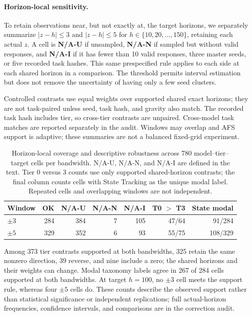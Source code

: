 \documentclass{article}
\begin{document}
\paragraph{Horizon-local sensitivity.}
To retain observations near, but not exactly at, the target horizons, we
separately summarize $|z-h|\leq 3$ and $|z-h|\leq 5$ for
$h\in\{10,20,\ldots,150\}$, retaining each actual $z$. A cell is
\textbf{N/A-U} if unsampled, \textbf{N/A-N} if sampled but without valid
responses, and \textbf{N/A-I} if it has fewer than 10 valid responses, three
master seeds, or five recorded task hashes. This same prespecified rule applies
to each side at each shared horizon in a comparison. The threshold permits
interval estimation but does not remove the uncertainty of having only a few
seed clusters.

Controlled contrasts use equal weights over supported shared exact horizons;
they are not task-paired unless seed, task hash, and gravity also match.
The recorded task hash includes tier, so cross-tier contrasts are unpaired.
Cross-model task matches are reported separately in the audit. Windows may
overlap and AFS support is adaptive; these summaries are not a balanced
fixed-grid experiment.

\begin{table}[H]
\centering
\caption{Horizon-local coverage and descriptive robustness across 780 model--tier--target cells per bandwidth. N/A-U, N/A-N, and N/A-I are defined in the text. Tier 0 versus 3 counts use only supported shared-horizon contrasts; the final column counts cells with State Tracking as the unique modal label. Repeated cells and overlapping windows are not independent.}
\label{tab:horizon_local_sensitivity}
\scriptsize
\begin{tabular}{lrrrrrr}
\toprule
Window & OK & N/A-U & N/A-N & N/A-I & T0 $>$ T3 & State modal \\
\midrule
$\pm3$ & 284 & 384 & 7 & 105 & 47/64 & 91/284 \\
$\pm5$ & 329 & 352 & 6 & 93 & 55/75 & 108/329 \\
\bottomrule
\end{tabular}
\end{table}

Among 373 tier contrasts supported at both bandwidths, 325 retain the same
nonzero direction, 39 reverse, and nine include a zero; the shared horizons
and their weights can change. Modal taxonomy labels agree in 267 of 284 cells
supported at both bandwidths. At target $h=100$, no $\pm3$ cell meets the
support rule, whereas four $\pm5$ cells do. These counts describe the observed
support rather than statistical significance or independent replications; full
actual-horizon frequencies, confidence intervals, and comparisons are in the
correction audit.
\end{document}
